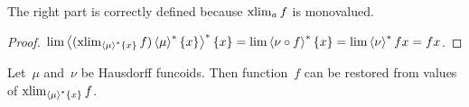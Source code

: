 \begin{rem}
The right part is correctly defined because
$\operatorname{xlim}_a f$ is monovalued.
\end{rem}

\begin{proof}
$\lim\left\langle (\operatorname{xlim}_{\left\langle \mu\right\rangle ^{\ast}\{x\}}f)\left\langle \mu\right\rangle ^{\ast}\{x\}\right\rangle ^{\ast}\{x\}=
\lim\left\langle \nu\circ f\right\rangle ^{\ast}\{x\}=\lim\left\langle \nu\right\rangle ^{\ast}fx=fx$.
\end{proof}

\begin{cor}
Let~$\mu$ and~$\nu$ be Hausdorff funcoids.
Then function~$f$ can be restored from values of $\operatorname{xlim}_{\left\langle \mu\right\rangle ^{\ast}\{x\}}f$.
\end{cor}